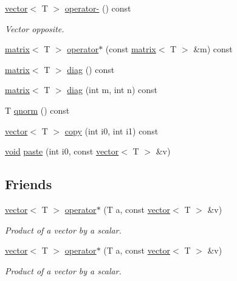 \begin{DoxyCompactItemize}
\item 
\hyperlink{classlibNumerics_1_1vector}{vector}$<$ T $>$ \hyperlink{classlibNumerics_1_1vector_a029117a6c2e3c205a1920c11c19a726a}{operator-\/} () const 
\begin{DoxyCompactList}\small\item\em Vector opposite. \end{DoxyCompactList}\item 
\hyperlink{classlibNumerics_1_1matrix}{matrix}$<$ T $>$ \hyperlink{classlibNumerics_1_1vector_ad1d6be8469b8f5051565e6deb88a270a}{operator$\ast$} (const \hyperlink{classlibNumerics_1_1matrix}{matrix}$<$ T $>$ \&m) const 
\item 
\hyperlink{classlibNumerics_1_1matrix}{matrix}$<$ T $>$ \hyperlink{classlibNumerics_1_1vector_a093952f9c25540682e3a97c11192cd17}{diag} () const 
\item 
\hyperlink{classlibNumerics_1_1matrix}{matrix}$<$ T $>$ \hyperlink{classlibNumerics_1_1vector_a5cd9ed207ffb02be6d8e0302b125fc8f}{diag} (int m, int n) const 
\item 
T \hyperlink{classlibNumerics_1_1vector_ac140ac952a0acc6c26a5110a0bddd893}{qnorm} () const 
\item 
\hyperlink{classlibNumerics_1_1vector}{vector}$<$ T $>$ \hyperlink{classlibNumerics_1_1vector_aad84cb6b6ba2b654644eda20cbcd2a4c}{copy} (int i0, int i1) const 
\item 
\hyperlink{png_8h_aa8c59027f9ab2769342f248709d68d17}{void} \hyperlink{classlibNumerics_1_1vector_af4ea0bbf3302600283134e0073bac06d}{paste} (int i0, const \hyperlink{classlibNumerics_1_1vector}{vector}$<$ T $>$ \&v)
\end{DoxyCompactItemize}
\subsection*{Friends}
\begin{DoxyCompactItemize}
\item 
\hyperlink{classlibNumerics_1_1vector}{vector}$<$ T $>$ \hyperlink{classlibNumerics_1_1vector_a8ec444552d3b02b68609345a658fad14}{operator$\ast$} (T a, const \hyperlink{classlibNumerics_1_1vector}{vector}$<$ T $>$ \&v)
\begin{DoxyCompactList}\small\item\em Product of a vector by a scalar. \end{DoxyCompactList}\item 
\hyperlink{classlibNumerics_1_1vector}{vector}$<$ T $>$ \hyperlink{classlibNumerics_1_1vector_a8ec444552d3b02b68609345a658fad14}{operator$\ast$} (T a, const \hyperlink{classlibNumerics_1_1vector}{vector}$<$ T $>$ \&v)
\begin{DoxyCompactList}\small\item\em Product of a vector by a scalar. \end{DoxyCompactList}\end{DoxyCompactItemize}
